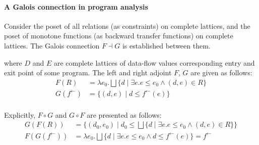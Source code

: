 \documentclass{llncs}
\newcommand{\Pow}{\mathcal{P}}
\newcommand{\Rel}{\mathrm{Rel}}
\newcommand{\Unidir}{\mathrm{Bwd}}
\newcommand{\tomon}{\to_{\mathrm{mon}}}
\newcommand{\fb}{{f^{\leftarrow}}}
\newcommand{\bigjoin}{\bigsqcup}
\newcommand{\comp}{\circ}
\begin{document}
 \paragraph{A Galois connection in program analysis}

    Consider the poset of all relations (as constraints) on complete lattices, and the poset of monotone functions (as backward transfer functions) on complete lattices.
    The Galois connection $F \dashv G$ is established between them.
  \begin{center}
  \end{center}
  where $D$ and $E$ are complete lattices of data-flow values corresponding entry and exit point of some program. The left and right adjoint $F$, $G$ are given as follows:
  \begin{align*}
    F (R) &= \lambda e_{0} . \bigjoin \{ d \mid \exists e. e \leq e_{0}  \land (d , e) \in R \} \\
    G (\fb) &= \{ (d , e) \mid d \leq \fb(e) \} \\
  \end{align*}

  Explicitly, $F \comp G$ and $G \comp F$ are presented as follows:
  \begin{align*}
    G(F(R)) &= \{ (d_{0},e_{0}) \mid d_{0} \leq \bigjoin \{ d \mid \exists e.e \leq e_{0} \land (d,e) \in R \}\} \\
    F(G(\fb)) &= \lambda e_{0} . \bigjoin \{ d \mid \exists e. e \leq e_{0} \land d \leq \fb(e) \} = \fb
  \end{align*}
\end{document}
